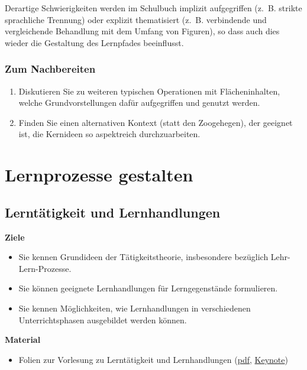 \documentclass[
]{scrbook}
\providecommand{\tightlist}{%
  \setlength{\itemsep}{0pt}\setlength{\parskip}{0pt}}
\renewenvironment{quote}{
  \list{}{
	\leftmargin0.2cm   %
    \rightmargin\leftmargin
      	\def\FrameCommand
    {%
        {\color{quoteColor}\vrule width 2pt}%
        \hspace{0pt}%
    }%
    \MakeFramed{\advance \hsize -\width \FrameRestore}    \color{quoteColor}
    }
  \item\relax
}
{\endlist\color{black}\endMakeFramed}
\theoremstyle{definition}
\theoremstyle{definition}
\theoremstyle{definition}
\theoremstyle{definition}
\theoremstyle{remark}
\begin{document}
Derartige Schwierigkeiten werden im Schulbuch implizit aufgegriffen (z.~B. strikte sprachliche Trennung) oder explizit thematisiert (z.~B. verbindende und vergleichende Behandlung mit dem Umfang von Figuren), so dass auch dies wieder die Gestaltung des Lernpfades beeinflusst.

\hypertarget{erstesintermezzo-nachbereitung}{%
\section{Zum Nachbereiten}\label{erstesintermezzo-nachbereitung}}

\begin{enumerate}
\def\labelenumi{\arabic{enumi}.}
\tightlist
\item
  Diskutieren Sie zu weiteren typischen Operationen mit Flächeninhalten, welche Grundvorstellungen dafür aufgegriffen und genutzt werden.
\item
  Finden Sie einen alternativen Kontext (statt den Zoogehegen), der geeignet ist, die Kernideen so aspektreich durchzuarbeiten.
\end{enumerate}

\hypertarget{part-lernprozesse-gestalten}{%
\part*{Lernprozesse gestalten}\label{part-lernprozesse-gestalten}}

\hypertarget{lerntaetigkeit-und-lernhandlungen}{%
\chapter{Lerntätigkeit und Lernhandlungen}\label{lerntaetigkeit-und-lernhandlungen}}

\begin{quote}
\textbf{Ziele}

\begin{itemize}
\tightlist
\item
  Sie kennen Grundideen der Tätigkeitstheorie, insbesondere bezüglich Lehr-Lern-Prozesse.
\item
  Sie können geeignete Lernhandlungen für Lerngegenstände formulieren.
\item
  Sie kennen Möglichkeiten, wie Lernhandlungen in verschiedenen Unterrichtsphasen ausgebildet werden können.
\end{itemize}

\textbf{Material}

\begin{itemize}
\tightlist
\item
  Folien zur Vorlesung zu Lerntätigkeit und Lernhandlungen (\href{files/Stoffdidaktik-WiSe2223-Kap6.pdf}{pdf}, \href{files/Stoffdidaktik-WiSe2223-Kap6.key}{Keynote})
\end{itemize}
\end{quote}
\end{document}
